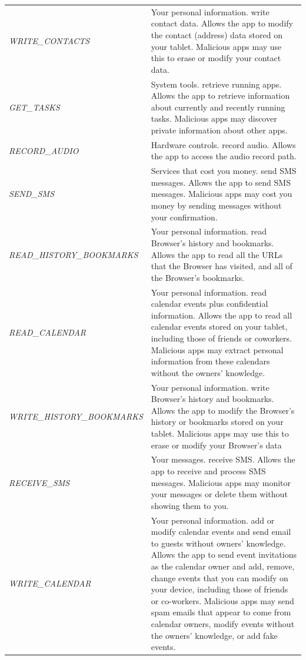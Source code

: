 \begin{table}[t]
\begin{small}
\begin{tabular}{p{3cm}|p{12.5cm}}
\textit{WRITE\_CONTACTS} & Your personal information. write contact data. Allows the app to modify the contact (address) data stored on your tablet.  Malicious apps may use this to erase or modify your contact data.  \\
\textit{GET\_TASKS} & System tools. retrieve running apps. Allows the app to retrieve information about currently and recently running tasks.  Malicious apps may discover private information about other apps.  \\
\textit{RECORD\_AUDIO} & Hardware controls. record audio. Allows the app to access the audio record path.  \\
\textit{SEND\_SMS} & Services that cost you money. send SMS messages. Allows the app to send SMS messages.  Malicious apps may cost you money by sending messages without your confirmation.  \\
\textit{READ\_HISTORY\_\-BOOKMARKS} & Your personal information. read Browser's history and bookmarks. Allows the app to read all the URLs that the Browser has visited, and all of the Browser's bookmarks.  \\
\textit{READ\_CALENDAR} & Your personal information. read calendar events plus confidential information. Allows the app to read all calendar events stored on your tablet, including those of friends or coworkers.  Malicious apps may extract personal information from these calendars without the owners' knowledge. \\
\textit{WRITE\_HISTORY\_\-BOOKMARKS} & Your personal information. write Browser's history and bookmarks. Allows the app to modify the Browser's history or bookmarks stored on your tablet.  Malicious apps may use this to erase or modify your Browser's data \\
\textit{RECEIVE\_SMS} & Your messages. receive SMS. Allows the app to receive and process SMS messages.  Malicious apps may monitor your messages or delete them without showing them to you.  \\
\textit{WRITE\_CALENDAR} & Your personal information. add or modify calendar events and send email to guests without owners' knowledge. Allows the app to send event invitations as the calendar owner and add, remove, change events that you can modify on your device, including those of friends or co-workers.  Malicious apps may send spam emails that appear to come from calendar owners, modify events without the owners' knowledge, or add fake events.  \\

\end{tabular}
\end{small}
\end{table}
